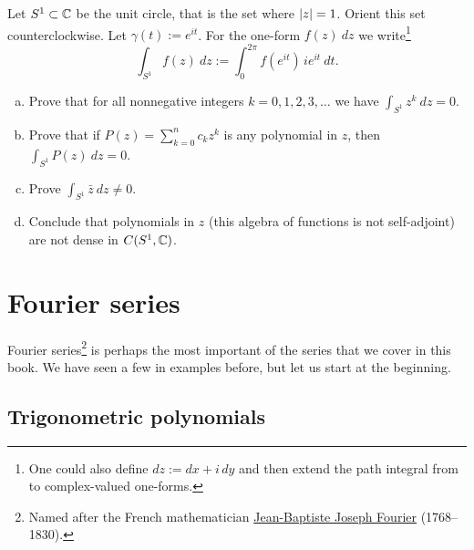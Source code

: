 \begin{samepage}
\begin{exercise} \label{exercise:selfadjointSW}
Let $S^1 \subset {\mathbb{C}}$ be the unit circle, that is the set where
$\lvert {z} \rvert = 1$.  Orient this set counterclockwise.
Let $\gamma(t) := e^{it}$.
For the one-form $f(z)~dz$ we write\footnote{%
One could also define $dz := dx + i \, dy$ and then
extend the path integral from  to complex-valued
one-forms.}
\begin{equation*}
\int_{S^1} f(z) ~dz := \int_0^{2\pi} f(e^{it}) \, i e^{it} ~ dt . 
\end{equation*}
\begin{enumerate}[a)]
\item
Prove that for all nonnegative integers $k = 0,1,2,3,\ldots$ we have
$\int_{S^1} z^k ~ dz = 0$.
\item
Prove that if
$P(z) = \sum_{k=0}^n c_k z^k$ is any
polynomial in $z$, then
$\int_{S^1} P(z) ~ dz = 0$.
\item
Prove
$\int_{S^1} \bar{z} ~ dz \not= 0$.
\item
Conclude that polynomials in $z$ (this algebra of functions is
not self-adjoint) are not dense in $C(S^1,{\mathbb{C}})$.
\end{enumerate}
\end{exercise}
\end{samepage}





\sectionnewpage
\section{Fourier series}
\label{sec:fourier}


Fourier series\footnote{%
Named after the French mathematician
\href{http://en.wikipedia.org/wiki/Joseph_Fourier}{Jean-Baptiste Joseph Fourier}
(1768--1830).} is perhaps the most important of the series that we cover in
this book.  We have seen a few in examples before, but let us start
at the beginning.

\subsection{Trigonometric polynomials}

